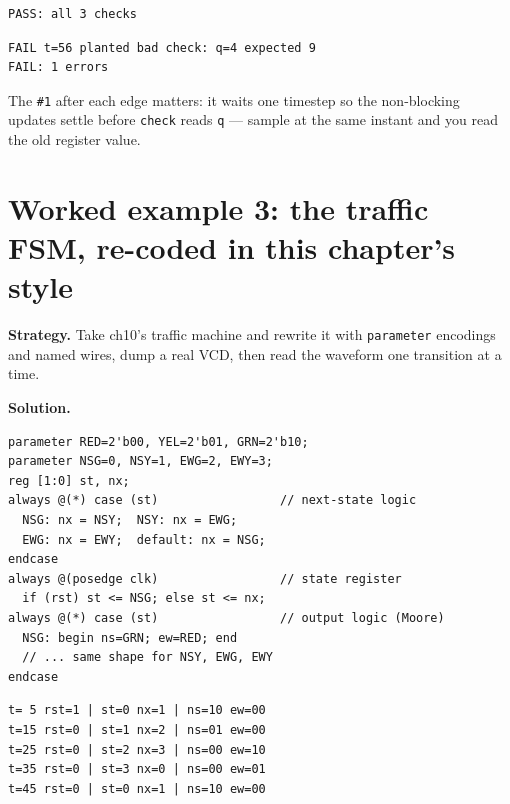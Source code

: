 \begin{lstlisting}[caption={Real output --- and proof the checker
bites: the second run compiles the same tb with \texttt{-DSABOTAGE},
planting one wrong expectation on purpose.},abovecaptionskip=0pt]
PASS: all 3 checks
\end{lstlisting}
\begin{lstlisting}[caption={The sabotaged run --- \texttt{FAIL} lines
name the check, the value, and the expectation.},abovecaptionskip=0pt]
FAIL t=56 planted bad check: q=4 expected 9
FAIL: 1 errors
\end{lstlisting}

The \texttt{\#1} after each edge matters: it waits one timestep so the
non-blocking updates settle before \texttt{check} reads \texttt{q} ---
sample at the same instant and you read the old register value.

\section{Worked example 3: the traffic FSM, re-coded in this chapter's
style}\label{sec:we-traffic2}

\textbf{Strategy.} Take ch10's traffic machine and rewrite it with
\texttt{parameter} encodings and named wires, dump a real VCD, then
read the waveform one transition at a time.

\textbf{Solution.}
\begin{lstlisting}[caption={\ttfamily code/ch11\_traffic2.v ---
parameters carry the encodings; the three blocks stay separate.},
label={lst:tr2}]
parameter RED=2'b00, YEL=2'b01, GRN=2'b10;
parameter NSG=0, NSY=1, EWG=2, EWY=3;
reg [1:0] st, nx;
always @(*) case (st)                 // next-state logic
  NSG: nx = NSY;  NSY: nx = EWG;
  EWG: nx = EWY;  default: nx = NSG;
endcase
always @(posedge clk)                 // state register
  if (rst) st <= NSG; else st <= nx;
always @(*) case (st)                 // output logic (Moore)
  NSG: begin ns=GRN; ew=RED; end
  // ... same shape for NSY, EWG, EWY
endcase
\end{lstlisting}

\begin{lstlisting}[caption={The real trace. Read it like the waveform:
each \texttt{st} edge also updates \texttt{nx} combinationally, so the
``next'' column always shows where the machine will land.},
abovecaptionskip=0pt]
t= 5 rst=1 | st=0 nx=1 | ns=10 ew=00
t=15 rst=0 | st=1 nx=2 | ns=01 ew=00
t=25 rst=0 | st=2 nx=3 | ns=00 ew=10
t=35 rst=0 | st=3 nx=0 | ns=00 ew=01
t=45 rst=0 | st=0 nx=1 | ns=10 ew=00
\end{lstlisting}

